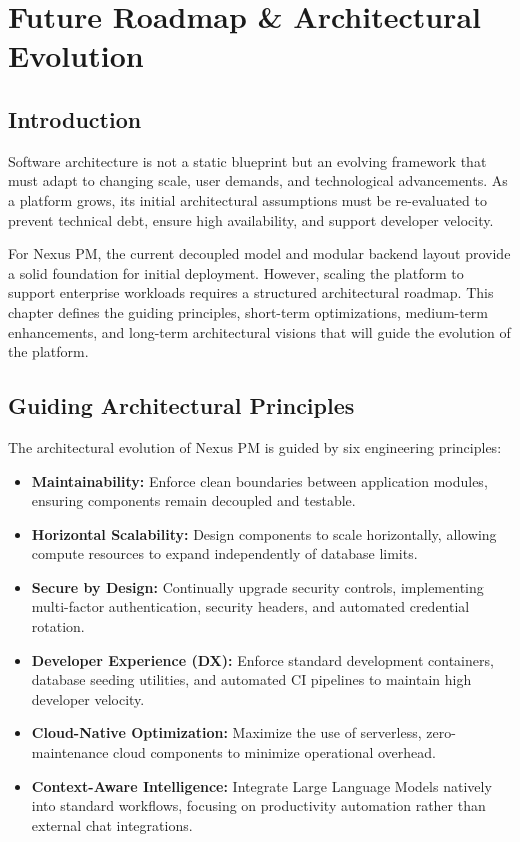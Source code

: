 \chapter{Future Roadmap \& Architectural Evolution}
\label{chap:future-roadmap}

\section{Introduction}
Software architecture is not a static blueprint but an evolving framework that must adapt to changing scale, user demands, and technological advancements. As a platform grows, its initial architectural assumptions must be re-evaluated to prevent technical debt, ensure high availability, and support developer velocity.

For Nexus PM, the current decoupled model and modular backend layout provide a solid foundation for initial deployment. However, scaling the platform to support enterprise workloads requires a structured architectural roadmap. This chapter defines the guiding principles, short-term optimizations, medium-term enhancements, and long-term architectural visions that will guide the evolution of the platform.

\section{Guiding Architectural Principles}
The architectural evolution of Nexus PM is guided by six engineering principles:
\begin{itemize}
    \item \textbf{Maintainability:} Enforce clean boundaries between application modules, ensuring components remain decoupled and testable.
    \item \textbf{Horizontal Scalability:} Design components to scale horizontally, allowing compute resources to expand independently of database limits.
    \item \textbf{Secure by Design:} Continually upgrade security controls, implementing multi-factor authentication, security headers, and automated credential rotation.
    \item \textbf{Developer Experience (DX):} Enforce standard development containers, database seeding utilities, and automated CI pipelines to maintain high developer velocity.
    \item \textbf{Cloud-Native Optimization:} Maximize the use of serverless, zero-maintenance cloud components to minimize operational overhead.
    \item \textbf{Context-Aware Intelligence:} Integrate Large Language Models natively into standard workflows, focusing on productivity automation rather than external chat integrations.
\end{itemize}

